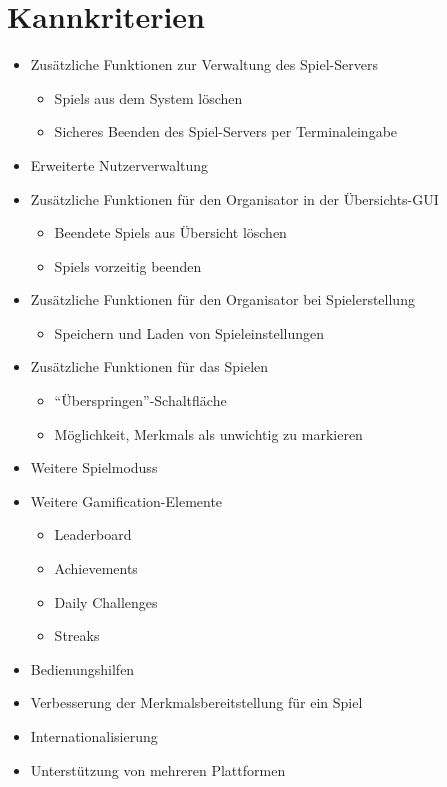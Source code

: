 \documentclass[a4paper]{scrreprt}
\begin{document}
    \section{Kannkriterien}
    \begin{itemize} %
    	\item Zusätzliche Funktionen zur Verwaltung des \Gls{Spiel-Server}s
   	\begin{itemize}
            \item \Glspl{Spiel} aus dem System löschen
            \item Sicheres Beenden des \Gls{Spiel-Server}s per Terminaleingabe
        \end{itemize}
	\item Erweiterte Nutzerverwaltung
	\item Zusätzliche Funktionen für den \Gls{Organisator} in der Übersichts-GUI
        \begin{itemize}
            \item Beendete \Glspl{Spiel} aus Übersicht löschen
            \item \Glspl{Spiel} vorzeitig beenden
        \end{itemize}
	\item Zusätzliche Funktionen für den \Gls{Organisator} bei Spielerstellung
        \begin{itemize}
            \item Speichern und Laden von \Gls{Spieleinstellungen}
        \end{itemize}
        \item Zusätzliche Funktionen für das Spielen 
        \begin{itemize}
            \item \enquote{Überspringen}-Schaltfläche 
            \item Möglichkeit, \Glspl{Merkmal} als unwichtig zu markieren 
        \end{itemize}
	\item Weitere \Glspl{Spielmodus}
	\item Weitere Gamification-Elemente
        \begin{itemize}
            \item Leaderboard %
            \item \Glspl{Achievement}
            \item Daily Challenges %
            \item Streaks %
        \end{itemize}
        \item Bedienungshilfen 
        \item Verbesserung der Merkmalsbereitstellung für ein \Gls{Spiel}
        \item Internationalisierung 
        \item Unterstützung von mehreren Plattformen
    \end{itemize}
\end{document}
